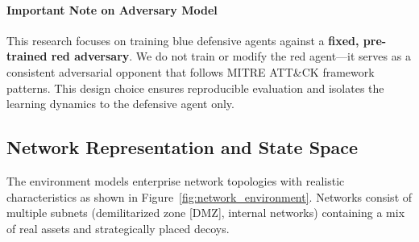 \documentclass[12pt,oneside]{article}
\begin{document}
\paragraph{Important Note on Adversary Model} This research focuses on training blue defensive agents against a \textbf{fixed, pre-trained red adversary}. We do not train or modify the red agent—it serves as a consistent adversarial opponent that follows MITRE ATT\&CK framework patterns. This design choice ensures reproducible evaluation and isolates the learning dynamics to the defensive agent only.

\subsection{Network Representation and State Space}

The environment models enterprise network topologies with realistic characteristics as shown in Figure~\ref{fig:network_environment}. Networks consist of multiple subnets (demilitarized zone [DMZ], internal networks) containing a mix of real assets and strategically placed decoys.
\end{document}
